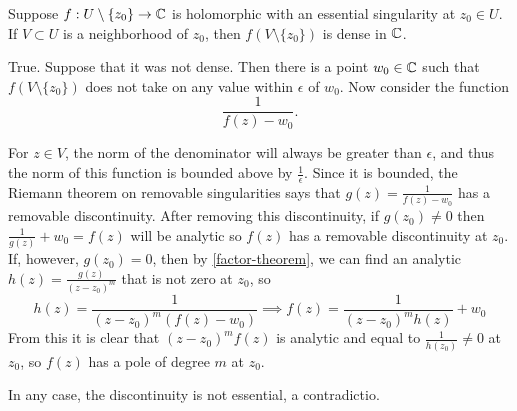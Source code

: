 \documentclass{homework}
\begin{document}
                                                                                                                                \begin{problem}\label{casorati-weierstrass}
                                                                                                                                  Suppose $f : U \setminus \{ z_0 \} \to \mathbb{C}$ is holomorphic with an essential singularity at $z_0 \in U$.  If $V \subset U$ is a neighborhood of $z_0$, then $f(V \setminus \{ z_0 \})$ is dense in $\mathbb{C}$.
                                                                                                                                  \end{problem}
                                                                                                                                  \begin{solution}
                                                                                                                                  True. Suppose that it was not dense. Then there is a point $w_0\in \mathbb{C}$ such that $f(V\setminus \{z_0\})$ does not take on any value within $\epsilon$ of $w_0$. Now consider the function 
                                                                                                                                  \[\frac{1}{f(z) - w_0}.\]

                                                                                                                                  For $z \in V$, the norm of the denominator will always be greater than $\epsilon$, and thus the norm of this function is bounded above by $\frac{1}{\epsilon}$. Since it is bounded, the Riemann theorem on removable singularities says that $g(z) = \frac{1}{f(z)-w_0}$ has a removable discontinuity. After removing this discontinuity, if $g(z_0) \neq 0$ then $\frac{1}{g(z)}+w_0 = f(z)$ will be analytic so $f(z)$ has a removable discontinuity at $z_0$.  If, however, $g(z_0)=0$, then by \ref{factor-theorem}, we can find an analytic $h(z) = \frac{g(z)}{(z-z_0)^m}$ that is not zero at $z_0$, so
                                                                                                                                  \[
                                                                                                                                  h(z) = \frac{1}{(z-z_0)^m(f(z)-w_0)}\implies f(z) = \frac{1}{(z-z_0)^mh(z)}+w_0
                                                                                                                                  \]
                                                                                                                                  From this it is clear that $(z-z_0)^mf(z)$ is analytic and equal to $\frac{1}{h(z_0)}\neq 0$ at $z_0$, so $f(z)$ has a pole of degree $m$ at $z_0$.

                                                                                                                                  In any case, the discontinuity is not essential, a contradictio.
                                                                                                                                  \end{solution}
\end{document}
